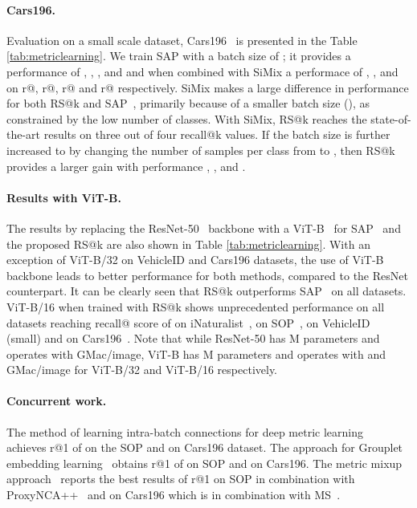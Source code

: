 \paragraph{Cars196.} Evaluation on a small scale dataset, Cars196~\cite{ksd+13} is presented in the Table \ref{tab:metriclearning}. We train SAP with a batch size of ; it provides a performance of , , , and  and when combined with SiMix a performace of , ,  and  on r@, r@, r@ and r@ respectively. SiMix makes a large difference in performance for both RS@k and SAP~\cite{bxk+20}, primarily because of a smaller batch size (), as constrained by the low number of classes. With SiMix, RS@k reaches the state-of-the-art results on three out of four recall@k values. If the batch size is further increased to  by changing the number of samples per class from  to , then RS@k provides a larger gain with performance , ,  and .

\paragraph{Results with ViT-B.} The results by replacing the ResNet-50~\cite{hzr+16} backbone with a ViT-B~\cite{dbk+21} for SAP~\cite{bxk+20} and the proposed RS@k are also shown in Table \ref{tab:metriclearning}. With an exception of ViT-B/32 on VehicleID and Cars196 datasets, the use of ViT-B backbone leads to better performance for both methods, compared to the ResNet counterpart. It can be clearly seen that RS@k outperforms SAP~\cite{bxk+20} on all datasets. ViT-B/16 when trained with RS@k shows unprecedented performance on all datasets reaching recall@ score of  on iNaturalist~\cite{vms+18},  on SOP~\cite{ohb16},  on VehicleID~\cite{ltw+16} (small) and  on Cars196~\cite{ksd+13}. Note that while ResNet-50 has  M parameters and operates with  GMac/image, ViT-B has  M parameters and operates with  and  GMac/image for ViT-B/32 and ViT-B/16 respectively.

\paragraph{Concurrent work.} The method of learning intra-batch connections for deep metric learning~\cite{sel21} achieves r@1 of  on the SOP and  on Cars196 dataset. The approach for Grouplet embedding learning~\cite{zlx+21} obtains r@1 of  on SOP and  on Cars196. The metric mixup approach~\cite{vpa+21} reports the best results of  r@1 on SOP in combination with ProxyNCA++~\cite{tdt20} and  on Cars196 which is in combination with MS~\cite{whh+19}.

